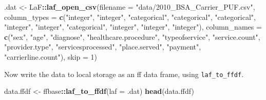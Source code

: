 \documentclass[]{book}
\newenvironment{Shaded}{\begin{snugshade}}{\end{snugshade}}
\newcommand{\KeywordTok}[1]{\textcolor[rgb]{0.13,0.29,0.53}{\textbf{#1}}}
\newcommand{\DataTypeTok}[1]{\textcolor[rgb]{0.13,0.29,0.53}{#1}}
\newcommand{\DecValTok}[1]{\textcolor[rgb]{0.00,0.00,0.81}{#1}}
\newcommand{\StringTok}[1]{\textcolor[rgb]{0.31,0.60,0.02}{#1}}
\newcommand{\OperatorTok}[1]{\textcolor[rgb]{0.81,0.36,0.00}{\textbf{#1}}}
\newcommand{\NormalTok}[1]{#1}
\theoremstyle{definition}
\theoremstyle{definition}
\theoremstyle{definition}
\theoremstyle{remark}
\begin{document}
\begin{Shaded}
\begin{Highlighting}[]
\NormalTok{.dat <-}\StringTok{ }\NormalTok{LaF}\OperatorTok{::}\KeywordTok{laf_open_csv}\NormalTok{(}\DataTypeTok{filename =} \StringTok{"data/2010_BSA_Carrier_PUF.csv"}\NormalTok{,}
                    \DataTypeTok{column_types =} \KeywordTok{c}\NormalTok{(}\StringTok{"integer"}\NormalTok{, }\StringTok{"integer"}\NormalTok{, }\StringTok{"categorical"}\NormalTok{, }\StringTok{"categorical"}\NormalTok{, }\StringTok{"categorical"}\NormalTok{, }\StringTok{"integer"}\NormalTok{, }\StringTok{"integer"}\NormalTok{, }\StringTok{"categorical"}\NormalTok{, }\StringTok{"integer"}\NormalTok{, }\StringTok{"integer"}\NormalTok{, }\StringTok{"integer"}\NormalTok{), }
                    \DataTypeTok{column_names =} \KeywordTok{c}\NormalTok{(}\StringTok{"sex"}\NormalTok{, }\StringTok{"age"}\NormalTok{, }\StringTok{"diagnose"}\NormalTok{, }\StringTok{"healthcare.procedure"}\NormalTok{, }\StringTok{"typeofservice"}\NormalTok{, }\StringTok{"service.count"}\NormalTok{, }\StringTok{"provider.type"}\NormalTok{, }\StringTok{"servicesprocessed"}\NormalTok{, }\StringTok{"place.served"}\NormalTok{, }\StringTok{"payment"}\NormalTok{, }\StringTok{"carrierline.count"}\NormalTok{), }
                    \DataTypeTok{skip =} \DecValTok{1}\NormalTok{)}
\end{Highlighting}
\end{Shaded}

Now write the data to local storage as an ff data frame, using
\texttt{laf\_to\_ffdf}.

\begin{Shaded}
\begin{Highlighting}[]
\NormalTok{data.ffdf <-}\StringTok{ }\NormalTok{ffbase}\OperatorTok{::}\KeywordTok{laf_to_ffdf}\NormalTok{(}\DataTypeTok{laf =}\NormalTok{ .dat)}
\KeywordTok{head}\NormalTok{(data.ffdf)}
\end{Highlighting}
\end{Shaded}
\end{document}
